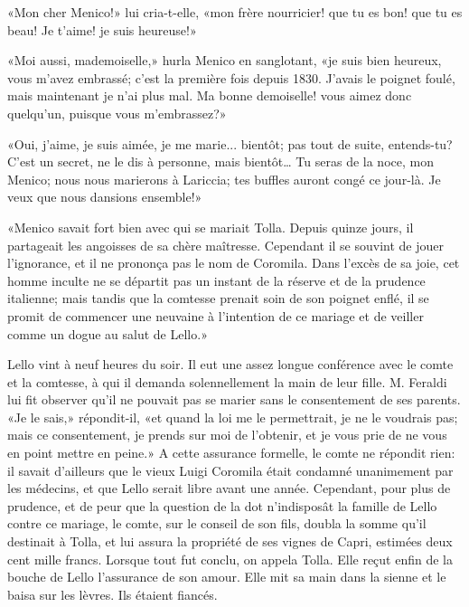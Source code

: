 «Mon cher Menico!» lui cria-t-elle, «mon frère nourricier! que tu es
bon! que tu es beau! Je t'aime! je suis heureuse!»

«Moi aussi, mademoiselle,» hurla Menico en sanglotant, «je suis bien
heureux, vous m'avez embrassé; c'est la première fois depuis 1830.
J'avais le poignet foulé, mais maintenant je n'ai plus mal. Ma bonne
demoiselle! vous aimez donc quelqu'un, puisque vous m'embrassez?»

«Oui, j'aime, je suis aimée, je me marie... bientôt; pas tout de suite,
entends-tu? C'est un secret, ne le dis à personne, mais bientôt\ldots{}
Tu seras de la noce, mon Menico; nous nous marierons à Lariccia; tes
buffles auront congé ce jour-là. Je veux que nous dansions ensemble!»

«Menico savait fort bien avec qui se mariait Tolla. Depuis quinze jours,
il partageait les angoisses de sa chère maîtresse. Cependant il se
souvint de jouer l'ignorance, et il ne prononça pas le nom de Coromila.
Dans l'excès de sa joie, cet homme inculte ne se départit pas un instant
de la réserve et de la prudence italienne; mais tandis que la comtesse
prenait soin de son poignet enflé, il se promit de commencer une
neuvaine à l'intention de ce mariage et de veiller comme un dogue au
salut de Lello.»

Lello vint à neuf heures du soir. Il eut une assez longue conférence
avec le comte et la comtesse, à qui il demanda solennellement la main de
leur fille. M. Feraldi lui fit observer qu'il ne pouvait pas se marier
sans le consentement de ses parents. «Je le sais,» répondit-il, «et
quand la loi me le permettrait, je ne le voudrais pas; mais ce
consentement, je prends sur moi de l'obtenir, et je vous prie de ne vous
en point mettre en peine.» A cette assurance formelle, le comte ne
répondit rien: il savait d'ailleurs que le vieux Luigi Coromila était
condamné unanimement par les médecins, et que Lello serait libre avant
une année. Cependant, pour plus de prudence, et de peur que la question
de la dot n'indisposât la famille de Lello contre ce mariage, le comte,
sur le conseil de son fils, doubla la somme qu'il destinait à Tolla, et
lui assura la propriété de ses vignes de Capri, estimées deux cent mille
francs. Lorsque tout fut conclu, on appela Tolla. Elle reçut enfin de la
bouche de Lello l'assurance de son amour. Elle mit sa main dans la
sienne et le baisa sur les lèvres. Ils étaient fiancés.
